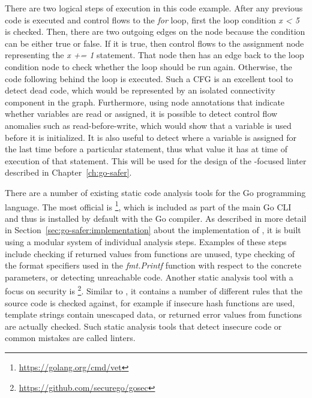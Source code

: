 There are two logical steps of execution in this code example.
After any previous code is executed and control flows to the \textit{for} loop, first the loop condition \textit{x < 5}
is checked.
Then, there are two outgoing edges on the node because the condition can be either true or false.
If it is true, then control flows to the assignment node representing the \textit{x += 1} statement.
That node then has an edge back to the loop condition node to check whether the loop should be run again.
Otherwise, the code following behind the loop is executed.
Such a \acrshort{CFG} is an excellent tool to detect dead code, which would be represented by an isolated connectivity
component in the graph.
Furthermore, using node annotations that indicate whether variables are read or assigned, it is possible to detect
control flow anomalies such as read-before-write, which would show that a variable is used before it is initialized.
It is also useful to detect where a variable is assigned for the last time before a particular statement, thus what
value it has at time of execution of that statement.
This will be used for the design of the \unsafe{}-focused linter \toolSafer{} described in Chapter~\ref{ch:go-safer}.

There are a number of existing static code analysis tools for the Go programming language.
The most official is \toolVet{}\footnote{\url{https://golang.org/cmd/vet}}, which is included as part of the main Go
\acrshort{CLI} and thus is installed by default with the Go compiler.
As described in more detail in Section~\ref{sec:go-safer:implementation} about the implementation of \toolSafer{}, it
is built using a modular system of individual analysis steps.
Examples of these steps include checking if returned values from functions are unused, type checking of the format
specifiers used in the \textit{fmt.Printf} function with respect to the concrete parameters, or detecting unreachable
code.
Another static analysis tool with a focus on security is \toolGosec{}\footnote{\url{https://github.com/securego/gosec}}.
Similar to \toolVet{}, it contains a number of different rules that the source code is checked against, for example if
insecure hash functions are used, template strings contain unescaped data, or returned error values from functions are
actually checked.
Such static analysis tools that detect insecure code or common mistakes are called linters.
